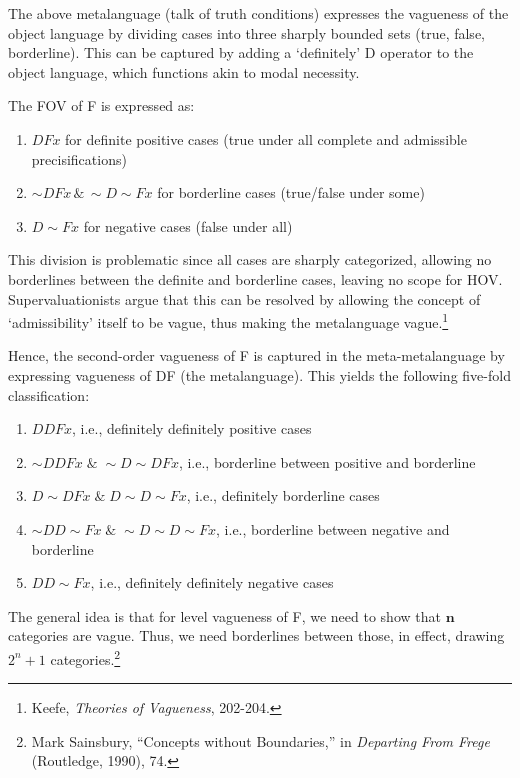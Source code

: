 The above metalanguage (talk of truth conditions) expresses the
vagueness of the object language by dividing cases into three sharply
bounded sets (true, false, borderline). This can be captured by adding a
`definitely' D operator to the object language, which functions akin to
modal necessity.

The FOV of F is expressed as:

\begin{enumerate}
\def\labelenumi{(\arabic{enumi})}
\item
  $DFx$ for definite positive cases (true under all complete and
  admissible precisifications)
\item
  ${\sim} DFx \, \& \, {\sim} D {\sim} Fx$ for borderline cases (true/false
  under some)
\item
  $D {\sim} Fx$ for negative cases (false under all)
\end{enumerate}

This division is problematic since all cases are sharply categorized,
allowing no borderlines between the definite and borderline cases,
leaving no scope for HOV. Supervaluationists argue that this can be
resolved by allowing the concept of `admissibility' itself to be vague,
thus making the metalanguage vague.\footnote{Keefe, \emph{Theories of
  Vagueness}, 202-204.}

Hence, the second-order vagueness of F is captured in the
meta-metalanguage by expressing vagueness of DF (the metalanguage). This
yields the following five-fold classification:

\begin{enumerate}
\def\labelenumi{(\arabic{enumi})}
\item
  $DDFx$, i.e., definitely definitely positive cases
\item
  ${\sim} DDFx \; \& \; {\sim} D {\sim} DFx$, i.e., borderline between positive
  and borderline
\item
  $D {\sim} DFx \; \& \; D{\sim} D{\sim} Fx$, i.e., definitely borderline cases
\item
  ${\sim}DD{\sim} Fx \; \& \; {\sim}D{\sim}D{\sim}Fx$, i.e., borderline between
  negative and borderline
\item
  $DD{\sim}Fx$, i.e., definitely definitely negative cases
\end{enumerate}

The general idea is that for  level vagueness of F, we need
to show that $\mathbf{n}$ categories are vague. Thus, we need borderlines
between those, in effect, drawing $2^n+1$ categories.\footnote{Mark
  Sainsbury, ``Concepts without Boundaries,'' in \emph{Departing From
  Frege} (Routledge, 1990), 74.}

